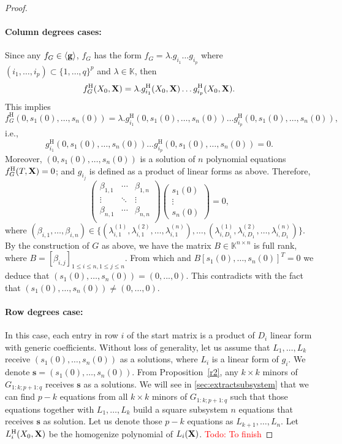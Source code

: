 \documentclass[11pt]{article}
\numberwithin{Property}{section}
\numberwithin{Theorem}{section}
\numberwithin{Proposition}{section}
\numberwithin{Lemma}{section}
\numberwithin{Corollary}{section}
\numberwithin{Definition}{section}
\numberwithin{Remark}{section}
\numberwithin{Conjecture}{section}
\numberwithin{Problem}{section}
\numberwithin{Claim}{section}
\theoremstyle{definition}
\numberwithin{Example}{section}
\def\s {\ensuremath{\mathbf{s}}}
\renewcommand{\leq}{\leqslant}
\newcommand{\field}{\mathbb{K}} %
\newcommand{\mat}[1]{\mathbf{\MakeUppercase{#1}}} %
\newcommand{\todo}[1]{\textcolor{red}{#1}} %
\newcommand{\improve}[1]{\textcolor{blue}{#1}} %
\begin{document}
\begin{proof}
\paragraph{Column degrees cases:} Since any $f_G \in \langle {\bf g} \rangle$, $f_G$ has the form $f_G = \lambda. g_{i_1} \ldots g_{i_p}$ where $(i_1, \ldots, i_p)\subset \{1, \ldots, q\}^p$ and $\lambda \in \field$, then 
\[
f_G^{\mathrm{H}}(X_0, \mat{X}) = \lambda.g_{i_1}^{\mathrm{H}}(X_0,\mat{X}) \ldots g_{i_p}^{\mathrm{H}}(X_0, \mat{X}).
\] This implies 
\[
f_G^{\mathrm{H}}(0, s_1(0), \ldots, s_n(0)) = \lambda.g_{i_1}^{\mathrm{H}}(0, s_1(0), \ldots, s_n(0)) \ldots g_{i_p}^{\mathrm{H}}(0, s_1(0),\ldots, s_n(0)),
\] i.e., 
\[
g_{i_1}^{\mathrm{H}}(0, s_1(0), \ldots, s_n(0)) \ldots g_{i_p}^{\mathrm{H}}(0, s_1(0), \ldots, s_n(0)) = 0.
\]
Moreover, $(0, s_1(0), \ldots, s_n(0))$ is a solution of $n$ polynomial equations $f_G^{\mathrm{H}}(T, \mat{X}) = 0$; and $g_{i_j}$ is defined as a product of linear forms as above. Therefore, 
\[
\left( \begin{matrix}
\beta_{1,1} & \cdots & \beta_{1,n}\\
\vdots &  \ddots & \vdots \\
\beta_{n,1} & \cdots & \beta_{n,n}\\
\end{matrix} \right)\left(\begin{matrix}
s_1(0)\\
\vdots \\
s_n(0)
\end{matrix}\right) = 0,
\]
where $(\beta_{i,1}, \ldots, \beta_{i,n}) \in \{(\lambda_{i,1}^{(1)}, \lambda_{i,1}^{(2)}, \ldots, \lambda_{i,1}^{(n)}), \ldots, (\lambda_{i,D_1}^{(1)}, \lambda_{i,D_1}^{(2)}, \ldots, \lambda_{i,D_1}^{(n)})\}$. By the construction of $G$ as above, we have the matrix $B \in \field^{n \times n}$ is full rank, where $B = [\beta_{i,j}]_{1 \leq i \leq n, 1 \leq j \leq n}$. From which and $B[s_1(0), \ldots, s_n(0)]^T = 0$ we deduce that $(s_1(0), \ldots, s_n(0)) = (0, ..., 0)$. This contradicts with the fact that $(s_1(0), \ldots, s_n(0)) \ne (0, \ldots, 0)$. 

\paragraph{Row degrees case:} In this case, each entry in row $i$ of the start matrix is a product of $D_i$ linear form with generic coefficients. Without loss of generality, let us assume that $L_1, \ldots, L_k$ receive $(s_1(0), \ldots, s_n(0))$ as a solutions, where $L_i$ is a linear form of $g_i$. We denote $\s = (s_1(0), \ldots, s_n(0))$. From Proposition~\ref{r2}, any $k \times  k$ minors of $G_{1:k;p+1:q}$ receives $\s$ as a solutions. We will see in \improve{\cref{sec:extractsubsystem}} that we can find $p-k$ equations from all $k \times  k$ minors of $G_{1:k;p+1:q}$ such that those equations together with $L_1, \ldots, L_k$ build a square subsystem $n$ equations that receives $\s$ as solution. Let us denote those $p-k$ equations as $L_{k+1}, \ldots, L_n$. Let $L_i^{\mathrm{H}}(X_0, \mat{X})$ be the homogenize polynomial of $L_i(\mat{X})$. \todo{Todo: To finish}


\end{proof}
\end{document}
